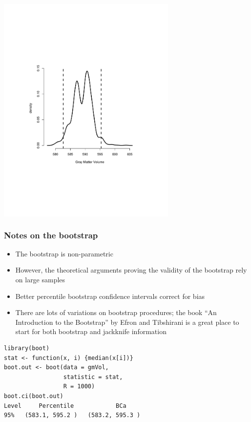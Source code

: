 \documentclass[aspectratio=169]{beamer}
\begin{document}
\begin{frame}
\includegraphics[width=3.5in]{bootstrap.pdf}
\end{frame}

\begin{frame}\frametitle{Notes on the bootstrap}
\begin{itemize}
\item The bootstrap is non-parametric
\item However, the theoretical arguments proving the validity of the
  bootstrap rely on large samples
\item Better percentile bootstrap confidence intervals correct for bias
\item There are lots of variations on bootstrap procedures; the book
  ``An Introduction to the Bootstrap'' by Efron and Tibshirani is a
  great place to start for both bootstrap and jackknife information
\end{itemize}
\end{frame}

\begin{frame}[fragile]
\begin{verbatim}
library(boot)
stat <- function(x, i) {median(x[i])}  
boot.out <- boot(data = gmVol,
                 statistic = stat,
                 R = 1000)
boot.ci(boot.out)
Level     Percentile            BCa          
95%   (583.1, 595.2 )   (583.2, 595.3 )  
\end{verbatim}
\end{frame}
\end{document}

